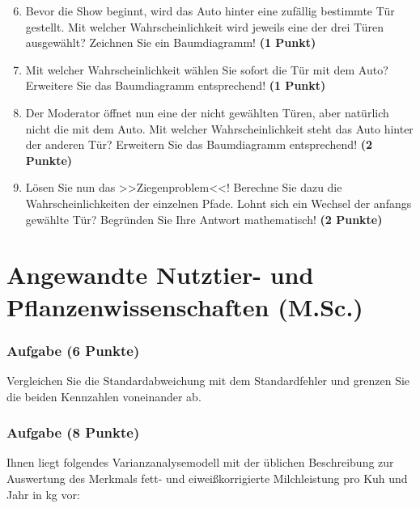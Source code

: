 \documentclass[a4paper, 9pt]{scrartcl}\usepackage[]{graphicx}\usepackage[]{xcolor}
\begin{document}
\begin{enumerate}
  \setcounter{enumi}{5}  
\item Bevor die Show beginnt, wird das Auto hinter eine zufällig bestimmte Tür gestellt. Mit welcher Wahrscheinlichkeit wird jeweils eine der drei Türen ausgewählt? Zeichnen Sie ein Baumdiagramm! \textbf{(1 Punkt)}
\item Mit welcher Wahrscheinlichkeit wählen Sie sofort die Tür mit dem Auto? Erweitere Sie das Baumdiagramm entsprechend! \textbf{(1 Punkt)}
\item Der Moderator öffnet nun eine der nicht gewählten Türen, aber natürlich nicht die mit dem Auto. Mit welcher Wahrscheinlichkeit steht das Auto hinter der anderen Tür? Erweitern Sie das Baumdiagramm entsprechend! \textbf{(2 Punkte)}
\item Lösen Sie nun das >>Ziegenproblem<<! Berechne Sie dazu die Wahrscheinlichkeiten der einzelnen Pfade. Lohnt sich ein Wechsel der anfangs gewählte Tür? Begründen Sie Ihre Antwort mathematisch! \textbf{(2 Punkte)}
\end{enumerate}
 






 
\clearpage
\part{Angewandte Nutztier- und Pflanzenwissenschaften (M.Sc.)}

\section{Aufgabe \hfill (6 Punkte)}
Vergleichen Sie die Standardabweichung mit dem Standardfehler und grenzen
Sie die beiden Kennzahlen voneinander ab.



\section{Aufgabe \hfill (8 Punkte)}
Ihnen liegt folgendes Varianzanalysemodell mit der {\"u}blichen Beschreibung
zur Auswertung des Merkmals fett- und eiwei{\ss}korrigierte Milchleistung pro
Kuh und Jahr in kg vor:
\end{document}
